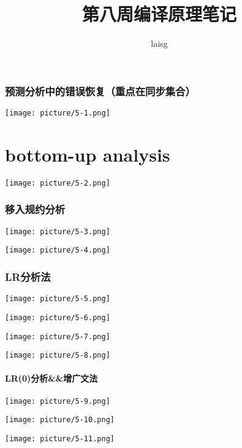 \documentclass[UTF8]{article}
\title{第八周编译原理笔记}
\author{laisg}
\begin{document}
  \maketitle
  
  \section{预测分析中的错误恢复（重点在同步集合）}%
  \label{sec:预测分析中的错误恢复_重点在同步集合_}
  
  \texttt{[image: picture/5-1.png]} 
  
  \part{bottom-up analysis}%
  \label{prt:bottom_up_analysis}
  
  \texttt{[image: picture/5-2.png]} 
  
  \section{移入规约分析}%
  \label{sec:移入规约分析}
  
  \texttt{[image: picture/5-3.png]} 
  
  \texttt{[image: picture/5-4.png]} 
  
  \section{LR分析法}%
  \label{sec:lr分析法}
  
  \texttt{[image: picture/5-5.png]} 
  
  \texttt{[image: picture/5-6.png]} 
  
  \texttt{[image: picture/5-7.png]} 

  \texttt{[image: picture/5-8.png]} 

  \subsection{LR(0)分析\&\&增广文法}%
  \label{sub:分析}
  
  \texttt{[image: picture/5-9.png]} 
  
  \texttt{[image: picture/5-10.png]} 

  \texttt{[image: picture/5-11.png]} 
\end{document}
